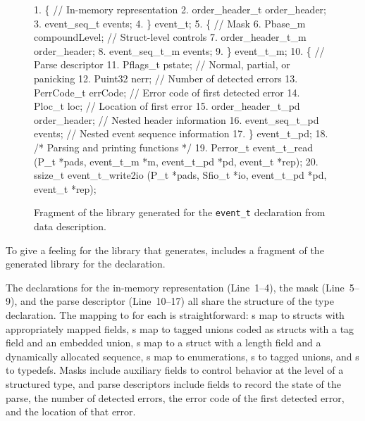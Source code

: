 \setcounter{totalnumber}{1}
\setcounter{dbltopnumber}{1}
\renewcommand{\topfraction}{0.85}
\renewcommand{\textfraction}{0.1}
\renewcommand{\floatpagefraction}{0.75}
\begin{figure*}
\begin{tiny}
\begin{code}
  1.   \{     // In-memory representation
  2.   order\_header\_t order\_header;
  3.   event\_seq\_t    events;
  4. \} event\_t;
 \mbox{}
  5.   \{     // Mask
  6.   Pbase\_m            compoundLevel;   // Struct-level controls
  7.   order\_header\_t\_m   order\_header;
  8.   event\_seq\_t\_m      events;
  9. \} event\_t\_m;
 \mbox{}
 10.   \{     // Parse descriptor
 11.   Pflags\_t   pstate;       // Normal, partial, or panicking 
 12.   Puint32    nerr;         // Number of detected errors
 13.   PerrCode\_t errCode;      // Error code of first detected error
 14.   Ploc\_t     loc;          // Location of first error
 15.   order\_header\_t\_pd order\_header;     // Nested header information
 16.   event\_seq\_t\_pd    events; // Nested event sequence information
 17. \} event\_t\_pd;
 \mbox{}
 18. /* Parsing and printing functions */
 19. Perror\_t event\_t\_read     (P\_t *pads, event\_t\_m *m, event\_t\_pd *pd, event\_t *rep);
 20. ssize\_t  event\_t\_write2io (P\_t *pads, Sfio\_t *io,   event\_t\_pd *pd, event\_t *rep);
\end{code}
\caption{Fragment of the library generated for the \texttt{event\_t}
  declaration from \dibbler{} data description.}
\label{figure:library}
\end{tiny}
\end{figure*}
\noindent
To give a feeling for the library that \pads{} generates, 
 includes a fragment of the generated 
library for the \dibbler{}  declaration.

The \C{} declarations for the in-memory representation (Line~1--4), the
mask (Line~5--9), 
and the parse descriptor (Line~10--17) all share the structure of the \pads{}
type declaration.  The mapping to \C{} for each is straightforward: 
s map to \C{} structs with appropriately mapped fields, 
s map to tagged unions coded as \C{} structs with a tag field 
and an embedded 
union, s map to a \C{} struct with a length field and a 
dynamically allocated sequence, s map to \C{} enumerations, s 
to tagged unions, and s to \C{} typedefs.  Masks include
auxiliary fields to control behavior at the level of a structured
type, and parse descriptors include fields to record the 
state of the parse, the number of detected errors, 
the error code of the first detected error, and the location of that error.

